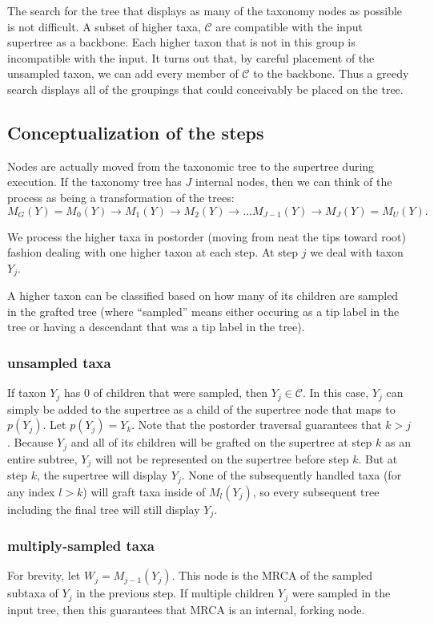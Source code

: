 \documentclass[english]{article}
\newcommand{\parent}[1]{p(#1)}
\begin{document}
The search for the tree that displays as many of the taxonomy nodes as possible is not difficult.
A subset of higher taxa, $\mathcal{C}$ are compatible with the input supertree as a backbone.
Each higher taxon that is not in this group is incompatible with the input.
It turns out that, by careful placement of the unsampled taxon, we can add every 
    member of $\mathcal{C}$ to the backbone.
Thus a greedy search displays all of the groupings that could conceivably be placed on the tree.

\subsection{Conceptualization of the steps}
Nodes are actually moved from the taxonomic tree to the supertree during execution.
If the taxonomy tree has $J$ internal nodes, then we can think of the process as being
a transformation of the trees:
\[M_G(Y) = M_0(Y) \rightarrow M_1(Y) \rightarrow M_2(Y) \rightarrow \ldots M_{J-1}(Y) \rightarrow M_J(Y) = M_U(Y).\]

We process the higher taxa in postorder (moving from neat the tips toward root) fashion dealing with one higher taxon at each step.
At step $j$ we deal with taxon $Y_j$.

A higher taxon can be classified based on how many of its children are
sampled in the grafted tree (where ``sampled'' means either occuring as a tip label in the tree or having a descendant that was a tip label in the tree).

\subsubsection{unsampled taxa}
If taxon $Y_j$ has 0 of children that were sampled, then $Y_j\in \mathcal{C}$.
    In this case, $Y_j$ can simply be added to the supertree as a child of the supertree node that maps to $\parent{Y_j}$.
    Let $\parent{Y_j} = Y_k$.
    Note that the postorder traversal guarantees that $k > j$.
    Because $Y_j$ and all of its children will be grafted on the supertree at step $k$ as
    an entire subtree, $Y_j$ will not be represented on the supertree before step $k$.
    But at step $k$, the supertree will display $Y_j$.
    None of the subsequently handled taxa (for any index $l> k$) will 
    graft taxa inside of $M_l(Y_j)$, so every subsequent tree including the
    final tree will still display $Y_j$.

\subsubsection{multiply-sampled taxa}
For brevity, let $W_j = M_{j-1}(Y_j)$.
This node is the MRCA of the sampled subtaxa of $Y_j$ in the previous step.
If multiple children $Y_j$ were sampled in the input tree, then this guarantees that MRCA is an internal, forking node.
\end{document}

